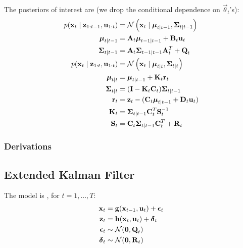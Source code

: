 The posteriors of interest are (we drop the conditional dependence on $\vec \theta_t$'s):
\begin{align}
	p(\vec x_t \mid \vec z_{1:t - 1}, \vec u_{1:t})	&= \Gauss\left(\vec x_t \mid \vec \mu_{t \mid t - 1}, \vec\Sigma_{t \mid t - 1}\right) \\
	\vec \mu_{t \mid t - 1}							&= \vec A_t \vec\mu_{t - 1 \mid t - 1} + \vec B_t \vec u_t \\
	\vec \Sigma_{t \mid t - 1}						&= \vec A_t \vec\Sigma_{t - 1 \mid t - 1} \vec A_t^T + \vec Q_t \\
	p(\vec x_t \mid \vec z_{1:t}, \vec u_{1:t}) 	&= \Gauss\left(\vec x_t \mid \vec \mu_{t \mid t}, \vec\Sigma_{t \mid t}\right) \\
	\vec \mu_{t \mid t}								&= \vec\mu_{t \mid t - 1} + \vec K_t \vec r_t \\
	\vec \Sigma_{t \mid t}							&= (\vec I - \vec K_t \vec C_t) \vec\Sigma_{t \mid t - 1} \\
	\vec r_t 										&= \vec z_t - (\vec C_t \vec \mu_{t \mid t - 1} + \vec D_t \vec u_t) \\
	\vec K_t										&= \vec\Sigma_{t \mid t - 1} \vec C_t^T \vec S_t^{-1} \\
	\vec S_t										&= \vec C_t \vec\Sigma_{t \mid t - 1}\vec C_t^T + \vec R_t
\end{align}

\subsubsection{Derivations}

\subsection{Extended Kalman Filter}
The model is , for $t = 1, \dotsc, T$:
\begin{align}
	\vec x_t	&= \vec g(\vec x_{t - 1}, \vec u_t) + \vec \epsilon_t \\
	\vec z_t	&= \vec h(\vec x_t, \vec u_t) + \vec \delta_t \\
	\vec\epsilon_t	&\sim \Gauss(\vec 0, \vec Q_t) \\
	\vec\delta_t	&\sim \Gauss(\vec 0, \vec R_t)
\end{align}

